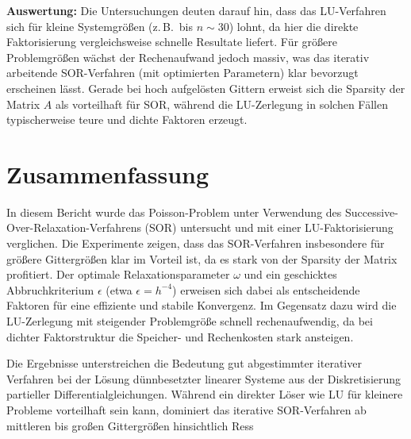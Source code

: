 \documentclass{scrartcl}
\begin{document}
\textbf{Auswertung:}
Die Untersuchungen deuten darauf hin, dass das LU-Verfahren sich für kleine
Systemgrößen (z.\,B.\ bis \(n\sim 30\)) lohnt, da hier die direkte
Faktorisierung vergleichsweise schnelle Resultate liefert. Für größere
Problemgrößen wächst der Rechenaufwand jedoch massiv, was das iterativ
arbeitende SOR-Verfahren (mit optimierten Parametern) klar bevorzugt erscheinen
lässt. Gerade bei hoch aufgelösten Gittern erweist sich die Sparsity der
Matrix \(A\) als vorteilhaft für SOR, während die LU-Zerlegung in solchen
Fällen typischerweise teure und dichte Faktoren erzeugt.

\section{Zusammenfassung}

In diesem Bericht wurde das Poisson-Problem unter Verwendung des
Successive-Over-Relaxation-Verfahrens (SOR) untersucht und mit einer
LU-Faktorisierung verglichen. Die Experimente zeigen, dass das SOR-Verfahren
insbesondere für größere Gittergrößen klar im Vorteil ist, da es stark von der
Sparsity der Matrix profitiert. Der optimale Relaxationsparameter \(\omega\)
und ein geschicktes Abbruchkriterium \(\epsilon\) (etwa \(\epsilon = h^{-4}\))
erweisen sich dabei als entscheidende Faktoren für eine effiziente und stabile
Konvergenz. Im Gegensatz dazu wird die LU-Zerlegung mit steigender Problemgröße
schnell rechenaufwendig, da bei dichter Faktorstruktur die Speicher- und
Rechenkosten stark ansteigen.

Die Ergebnisse unterstreichen die Bedeutung gut abgestimmter iterativer
Verfahren bei der Lösung dünnbesetzter linearer Systeme aus der Diskretisierung
partieller Differentialgleichungen. Während ein direkter Löser wie LU für
kleinere Probleme vorteilhaft sein kann, dominiert das iterative SOR-Verfahren
ab mittleren bis großen Gittergrößen hinsichtlich Ress

\printbibliography
\end{document}
